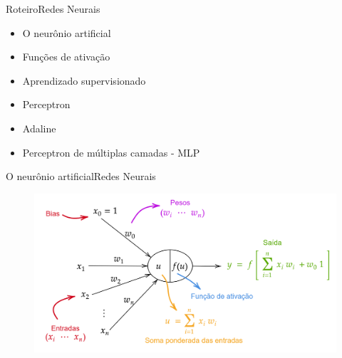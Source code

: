 \documentclass[t]{beamer}
\begin{document}

\begin{ftst}{Roteiro}{Redes Neurais}

\begin{itemize}
    \item O neurônio artificial
    \item Funções de ativação
    \item Aprendizado supervisionado
    \item Perceptron
    \item Adaline
    \item Perceptron de múltiplas camadas - MLP
\end{itemize} 

\end{ftst}


\begin{ftst}{O neurônio artificial}{Redes Neurais}


\begin{figure}
    \centering
    \includegraphics[scale=0.15]{Figuras/neuronio.png}
\end{figure}


\end{ftst}

\end{document}
